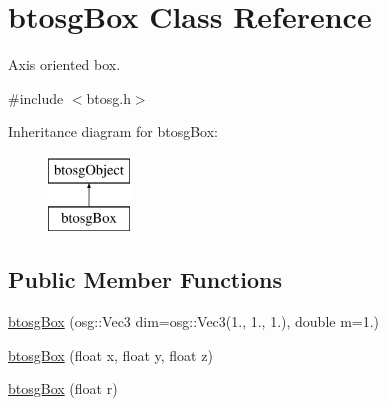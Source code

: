 \hypertarget{classbtosgBox}{}\section{btosg\+Box Class Reference}
\label{classbtosgBox}


Axis oriented box.  




{\ttfamily \#include $<$btosg.\+h$>$}

Inheritance diagram for btosg\+Box\+:\begin{figure}[H]
\begin{center}
\leavevmode
\includegraphics[height=2.000000cm]{classbtosgBox}
\end{center}
\end{figure}
\subsection*{Public Member Functions}
\begin{DoxyCompactItemize}
\item 
\hyperlink{classbtosgBox_a7b899d77d6ce1cd9fd1a506219814c2c}{btosg\+Box} (osg\+::\+Vec3 dim=osg\+::\+Vec3(1., 1., 1.), double m=1.)
\item 
\hyperlink{classbtosgBox_a0b7809cf498d50ced7c6e4a1bf0f5470}{btosg\+Box} (float x, float y, float z)
\item 
\hyperlink{classbtosgBox_a3b17e84e3f94aabdc7b8517bd802a5c9}{btosg\+Box} (float r)
\end{DoxyCompactItemize}
